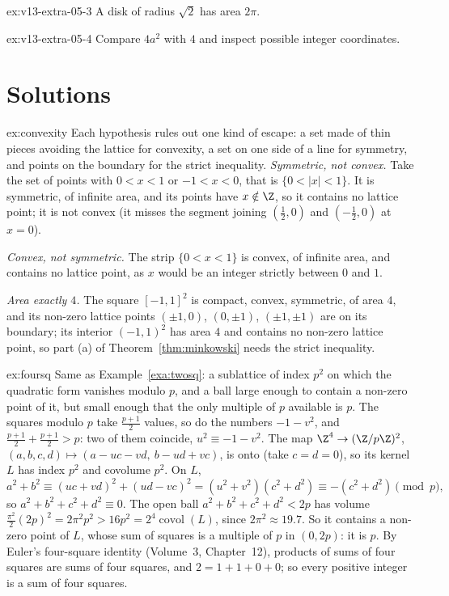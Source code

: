 \begin{hint}{ex:v13-extra-05-3}
A disk of radius $\sqrt2$ has area $2\pi$.
\end{hint}

\begin{hint}{ex:v13-extra-05-4}
Compare $4a^2$ with $4$ and inspect possible integer coordinates.
\end{hint}

\section{Solutions}

\begin{solution}{ex:convexity}
\idea Each hypothesis rules out one kind of escape: a set made of thin pieces avoiding the lattice for convexity, a set
on one side of a line for symmetry, and points on the boundary for the strict inequality.
\writeup \emph{Symmetric, not convex.} Take the set of points with $0<x<1$ or $-1<x<0$, that is $\{0<|x|<1\}$. It is symmetric, of infinite area, and its
points have $x\notin\Z$, so it contains no lattice point; it is not convex (it misses the segment joining $(\frac12,0)$
and $(-\frac12,0)$ at $x=0$).

\emph{Convex, not symmetric.} The strip $\{0<x<1\}$ is convex, of infinite area, and contains no lattice point, as $x$
would be an integer strictly between $0$ and $1$.

\emph{Area exactly $4$.} The square $[-1,1]^2$ is compact, convex, symmetric, of area $4$, and its non-zero lattice points
$(\pm1,0)$, $(0,\pm1)$, $(\pm1,\pm1)$ are on its boundary; its interior $(-1,1)^2$ has area $4$ and contains no non-zero
lattice point, so part (a) of Theorem~\ref{thm:minkowski} needs the strict inequality.
\end{solution}

\begin{solution}{ex:foursq}
\idea Same as Example~\ref{exa:twosq}: a sublattice of index $p^2$ on which the quadratic form vanishes modulo $p$, and a
ball large enough to contain a non-zero point of it, but small enough that the only multiple of $p$ available is $p$.
\writeup The squares modulo $p$ take $\frac{p+1}2$ values, so do the numbers $-1-v^2$, and $\frac{p+1}2+\frac{p+1}2>p$: two of
them coincide, $u^2\equiv-1-v^2$. The map $\Z^4\to(\Z/p\Z)^2$, $(a,b,c,d)\mapsto(a-uc-vd,\ b-ud+vc)$, is onto (take
$c=d=0$), so its kernel $L$ has index $p^2$ and covolume $p^2$. On $L$,
\[
a^2+b^2\equiv(uc+vd)^2+(ud-vc)^2=(u^2+v^2)(c^2+d^2)\equiv-(c^2+d^2)\pmod p,
\]
so $a^2+b^2+c^2+d^2\equiv0$. The open ball $a^2+b^2+c^2+d^2<2p$ has volume $\frac{\pi^2}2(2p)^2=2\pi^2p^2>16p^2=2^4
\operatorname{covol}(L)$, since $2\pi^2\approx19.7$. So it contains a non-zero point of $L$, whose sum of squares is a
multiple of $p$ in $(0,2p)$: it is $p$. By Euler's four-square identity (Volume~3, Chapter~12), products of sums of four
squares are sums of four squares, and $2=1+1+0+0$; so every positive integer is a sum of four squares.
\end{solution}

